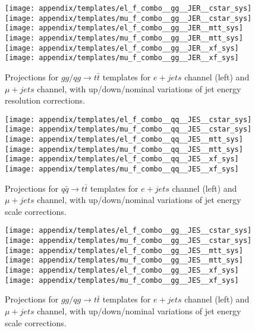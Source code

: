 \begin{figure}[hbt]
  \begin{center}
    \texttt{[image: appendix/templates/el\_f\_combo\_\_gg\_\_JER\_\_cstar\_sys]}
    \texttt{[image: appendix/templates/mu\_f\_combo\_\_gg\_\_JER\_\_cstar\_sys]}    
    \texttt{[image: appendix/templates/el\_f\_combo\_\_gg\_\_JER\_\_mtt\_sys]}
    \texttt{[image: appendix/templates/mu\_f\_combo\_\_gg\_\_JER\_\_mtt\_sys]}
    \texttt{[image: appendix/templates/el\_f\_combo\_\_gg\_\_JER\_\_xf\_sys]}
    \texttt{[image: appendix/templates/mu\_f\_combo\_\_gg\_\_JER\_\_xf\_sys]}
  \caption{\small Projections for $gg/qg \rightarrow t\bar t$ templates for $e+jets$ channel (left) and $\mu+jets$ channel, with up/down/nominal variations of jet energy resolution corrections.}
  \label{appendix:JER gg temp}
  \end{center}
\end{figure}

\begin{figure}[hbt]
  \begin{center}
    \texttt{[image: appendix/templates/el\_f\_combo\_\_qq\_\_JES\_\_cstar\_sys]}
    \texttt{[image: appendix/templates/mu\_f\_combo\_\_qq\_\_JES\_\_cstar\_sys]}    
    \texttt{[image: appendix/templates/el\_f\_combo\_\_qq\_\_JES\_\_mtt\_sys]}
    \texttt{[image: appendix/templates/mu\_f\_combo\_\_qq\_\_JES\_\_mtt\_sys]}
    \texttt{[image: appendix/templates/el\_f\_combo\_\_qq\_\_JES\_\_xf\_sys]}
    \texttt{[image: appendix/templates/mu\_f\_combo\_\_qq\_\_JES\_\_xf\_sys]}
  \caption{\small Projections for $q\bar q \rightarrow t\bar t$  templates for $e+jets$ channel (left) and $\mu+jets$ channel, with up/down/nominal variations of jet energy scale corrections.}
  \label{appendix:JES qq temp}
  \end{center}
\end{figure}

\begin{figure}[hbt]
  \begin{center}
    \texttt{[image: appendix/templates/el\_f\_combo\_\_gg\_\_JES\_\_cstar\_sys]}
    \texttt{[image: appendix/templates/mu\_f\_combo\_\_gg\_\_JES\_\_cstar\_sys]}    
    \texttt{[image: appendix/templates/el\_f\_combo\_\_gg\_\_JES\_\_mtt\_sys]}
    \texttt{[image: appendix/templates/mu\_f\_combo\_\_gg\_\_JES\_\_mtt\_sys]}
    \texttt{[image: appendix/templates/el\_f\_combo\_\_gg\_\_JES\_\_xf\_sys]}
    \texttt{[image: appendix/templates/mu\_f\_combo\_\_gg\_\_JES\_\_xf\_sys]}
  \caption{\small Projections for $gg/qg \rightarrow t\bar t$ templates for $e+jets$ channel (left) and $\mu+jets$ channel, with up/down/nominal variations of jet energy scale corrections.}
  \label{appendix:JES gg temp}
  \end{center}
\end{figure}

